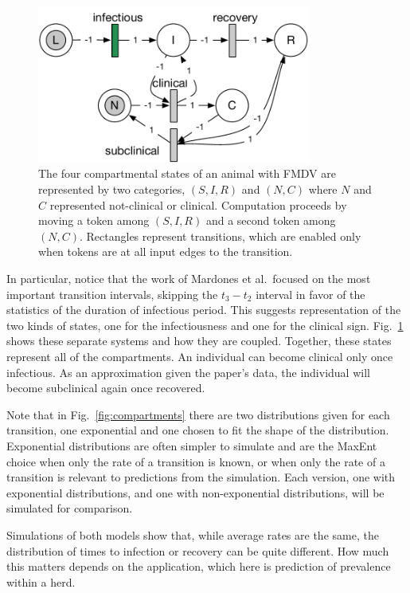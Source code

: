 \documentclass{article}
\begin{document}
\begin{figure}
\centerline{\includegraphics[width=9cm]{individual_gspn}}
\caption{The four compartmental states of an animal with FMDV
are represented by two categories, $(S,I,R)$ and $(N,C)$
where $N$ and $C$ represented not-clinical or clinical.
Computation proceeds by moving a token among $(S,I,R)$ and a
second token among $(N,C)$. Rectangles represent transitions,
which are enabled only when tokens are at all input edges to the
transition.\label{fig:individual_gspn}}
\end{figure}%
In particular, notice that the work of Mardones et al.\ focused
on the most important transition intervals, skipping the $t_3-t_2$
interval in favor of the statistics of the duration of infectious
period. This suggests representation of the two kinds of states,
one for the infectiousness and one for the clinical sign.
Fig.~\ref{fig:individual_gspn} shows these separate systems
and how they are coupled.
Together, these states
represent all of the compartments. An individual can become clinical
only once infectious. As an approximation given the paper's data, the individual
will become subclinical again once recovered.

Note that in Fig.~\ref{fig:compartments} there are two distributions
given for each transition, one exponential and one chosen
to fit the shape of the distribution. Exponential distributions
are often simpler to simulate and are the MaxEnt choice when
only the rate of a transition is known, or when only the rate
of a transition is relevant to predictions from the simulation.
Each version, one with exponential distributions, and one
with non-exponential distributions, will be simulated for
comparison.

Simulations of both models show that, while average rates
are the same, the distribution
of times to infection or recovery can be quite different.
How much this matters depends on the application, which
here is prediction of prevalence within a herd.
\end{document}
